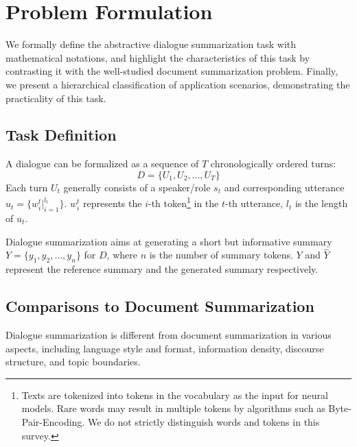 \section{Problem Formulation}
\label{sec:task}

We formally define the abstractive dialogue summarization
task with mathematical notations, and highlight the characteristics of this task by contrasting it with the well-studied document summarization
problem. Finally, we present a hierarchical classification of application scenarios, demonstrating the practicality of this task.

\subsection{Task Definition}\label{sec:taskdefinition}
A dialogue can be formalized as a sequence of $T$ chronologically ordered turns:
\begin{equation}
	D = \{U_1, U_2, ..., U_T\}
	\label{eq:dialogue}
\end{equation}
Each turn $U_t$ generally consists of a speaker/role $s_t$ and corresponding utterance $u_t = \{w_i^t|_{i=1}^{l_t}\}$. $w_i^t$ represents the $i$-th token\footnote{
Texts are tokenized into tokens in the vocabulary as the input for neural models. Rare words may result in multiple tokens by algorithms such as Byte-Pair-Encoding. We do not strictly distinguish words and tokens in this survey.} in the $t$-th utterance, $l_t$ is the length of $u_t$.

Dialogue summarization aims at generating a short but informative 
summary $Y=\{y_1,y_2,...,y_n\}$ for $D$, where $n$ is 
the number of summary tokens. $Y$ and $\hat{Y}$ represent the reference summary and the generated summary respectively.



\subsection{Comparisons to Document Summarization}\label{sec:divergence}

Dialogue summarization is different from document summarization in various 
aspects, including language style and format, information density, 
discourse structure, and topic boundaries.


